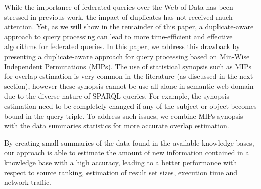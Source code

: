 \documentclass{sig-alternate}  %
\begin{document}
While the importance of federated queries over the Web of Data has been stressed in previous work, the impact of duplicates has not received much attention.
Yet, as we will show in the remainder of this paper, a duplicate-aware approach to query processing can lead to more time-efficient and effective algorithms for federated queries.
In this paper, we address this drawback by presenting a duplicate-aware approach for query processing based on Min-Wise Independent Permutations (MIPs). The use of statistical synopsis such as MIPs for overlap estimation is very common in the literature (as discussed in the next section), however these synopsis cannot be use all alone in semantic web domain due to the diverse nature of SPARQL queries. For example, the synopsis estimation  need to be completely changed if any of the subject or object becomes bound in the query triple. To address such issues, we combine MIPs synopsis with the data summaries statistics for more accurate overlap estimation. 

By creating small summaries of the data found in the available knowledge bases, our approach is able to estimate the amount of new information contained in a knowledge base with a high accuracy, leading to a better performance with respect to source ranking, estimation of result set sizes, execution time and network traffic. 
\end{document}
